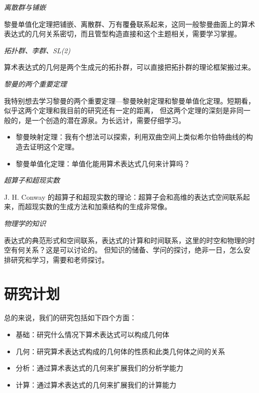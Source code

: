 \documentclass[a4paper,12pt]{article}
\numberwithin{problem}{section}
\numberwithin{definition}{section}
\numberwithin{lemma}{section}
\numberwithin{proposition}{section}
\numberwithin{theorem}{section}
\numberwithin{grammar}{section}
\numberwithin{program}{section}
\numberwithin{convention}{section}
\numberwithin{corollary}{section}
\begin{document}
\emph{离散群与铺嵌}

黎曼单值化定理把铺嵌、离散群、万有覆叠联系起来，这同一般黎曼曲面上的算术表达式的几何关系密切，而且管型构造直接和这个主题相关，需要学习掌握。

\emph{拓扑群、李群、SL(2)}

算术表达式的几何是两个生成元的拓扑群，可以直接把拓扑群的理论框架搬过来。

\emph{黎曼的两个重要定理}

我特别想去学习黎曼的两个重要定理—黎曼映射定理和黎曼单值化定理。短期看，似乎这两个定理和我目前的研究还有一定的距离，
但这两个定理的深刻是非同一般的，是一个创造的潜在源泉。为长远计，需要仔细学习。

\begin{itemize}
    \item 黎曼映射定理：我有个想法可以探索，利用双曲空间上类似希尔伯特曲线的构造去证明这个定理。
    \item 黎曼单值化定理：单值化能用算术表达式几何来计算吗？
\end{itemize}

\emph{超算子和超现实数}

J. H. Conway 的超算子和超现实数的理论：超算子会和高维的表达式空间联系起来，而超现实数的生成方法和加乘结构的生成非常像。

\emph{物理学的知识}

表达式的典范形式和空间联系，表达式的计算和时间联系，这里的时空和物理的时空有何关系？这是可以讨论的。
但知识的储备、学问的探讨，绝非一日，怎么安排研究和学习，需要和老师探讨。

\newpage
\section{研究计划}

总的来说，我们的研究包括如下四个方面：
\begin{itemize}
    \item 基础：研究什么情况下算术表达式可以构成几何体
    \item 几何：研究算术表达式构成的几何体的性质和此类几何体之间的关系
    \item 分析：通过算术表达式的几何来扩展我们的分析学能力
    \item 计算：通过算术表达式的几何来扩展我们的计算能力
\end{itemize}
\end{document}
